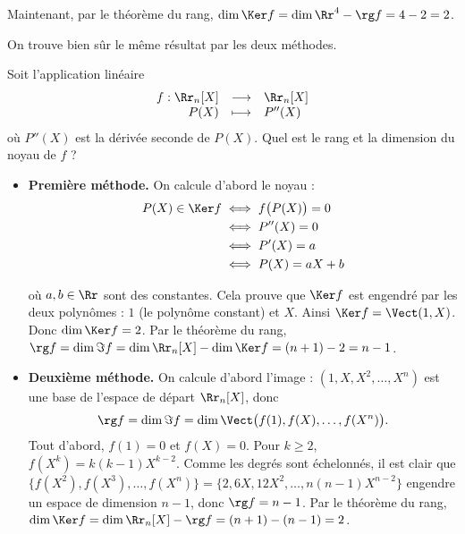 \documentclass[class=report,crop=false]{standalone}
\begin{document}
\begin{exemple}
\begin{itemize}
Maintenant, par le théorème du rang,
$\dim \Ker f = \dim \Rr^4 - \rg f = 4-2 =2$.
\end{itemize}

On trouve bien sûr le même résultat par les deux méthodes.

\end{exemple}

\begin{exemple}
Soit l'application linéaire
$$\begin{array}{rcl}
f : \Rr_n[X] &\longrightarrow&  \Rr_n[X] \\
        P(X) &\longmapsto& P''(X)
  \end{array}$$
où $P''(X)$ est la dérivée seconde de $P(X)$.
Quel est le rang et la dimension du noyau de $f$ ?

\begin{itemize}
  \item \textbf{Première méthode.}
  On calcule d'abord le noyau :
  \begin{align*}
  P(X) \in \Ker f 
  &\iff f\big(P(X)\big) = 0 \\
  &\iff P''(X) = 0 \\
  &\iff P'(X)=a \\
  &\iff P(X) = aX+b  
  \end{align*}

  où $a,b \in \Rr$ sont des constantes.
  Cela prouve que $\Ker f$ est engendré par les deux polynômes : $1$ (le polynôme constant)
  et $X$. Ainsi $\Ker f = \Vect(1,X)$. Donc $\dim \Ker f = 2$.
  Par le théorème du rang, $\rg f = \dim \Im f = \dim \Rr_n[X] - \dim \Ker f = (n+1) - 2 = n-1$.

  \item \textbf{Deuxième méthode.} On calcule d'abord l'image :
  $(1,X,X^2,\ldots,X^n)$ est une base de l'espace de départ $\Rr_n[X]$,
  donc $$\rg f = \dim \Im f = \dim \Vect \big(f(1), f(X), \ldots, f(X^n) \big).$$
  Tout d'abord, $f(1)=0$ et $f(X)=0$. Pour $k \ge 2$, $f(X^k) = k(k-1)X^{k-2}$.
  Comme les degrés sont échelonnés, il est clair que
  $\big\{f(X^2), f(X^3), \ldots, f(X^n) \big\} = \big\{2, 6X, 12X^2, \ldots, n(n-1)X^{n-2}\big\}$
  engendre un espace de dimension $n-1$, donc $\rg f = n-1$.
  Par le théorème du rang, $\dim \Ker f = \dim \Rr_n[X] - \rg f = (n+1) - (n-1) = 2$.
\end{itemize}
\end{exemple}
\end{document}
